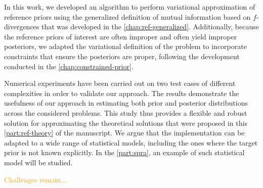 In this work, we developed an algorithm to perform variational approximation of reference priors using the generalized definition of mutual information based on $f$-divergences that was developed in the \cref{chap:ref-generalized}.
Additionally, because the reference priors of interest are often improper and often yield improper posteriors, we adapted the variational definition of the problem to incorporate constraints that ensure the posteriors are proper, following the development conducted in the \cref{chap:constrained-prior}. 


Numerical experiments have been carried out on two test cases of different complexities in order to validate our approach.
The results demonstrate the usefulness of our approach in estimating both prior and posterior distributions across the considered problems. %
This study thus provides a flexible and robust solution for approximating the theoretical solutions that were proposed in this \cref{part:ref-theory} of the manuscript.
We argue that the implementation can be adapted to a wide range of statistical models, including the ones where the target prior is not known explicitly.
In the \cref{part:spra}, an example of such statistical model will be studied.

\textcolor{orange}{Challenges remain...}











